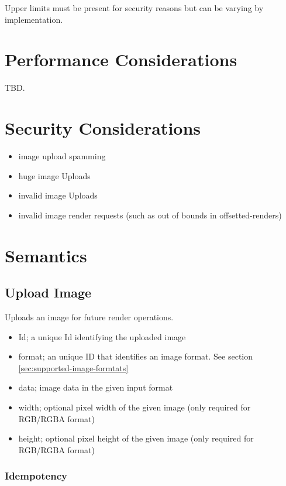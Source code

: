 \documentclass{article}
\begin{document}
Upper limits must be present for security reasons but can be varying by implementation.


\section{Performance Considerations} %

TBD.

\section{Security Considerations} %

\begin{itemize}
    \item image upload spamming
    \item huge image Uploads
    \item invalid image Uploads
    \item invalid image render requests (such as out of bounds in offsetted-renders)
\end{itemize}

\section{Semantics} %

\subsection{Upload Image}

Uploads an image for future render operations.

\begin{itemize}
    \item Id; a unique Id identifying the uploaded image
    \item format; an unique ID that identifies an image format. See section \ref{sec:supported-image-formtats}
    \item data; image data in the given input format
    \item width; optional pixel width of the given image (only required for RGB/RGBA format)
    \item height; optional pixel height of the given image (only required for RGB/RGBA format)
\end{itemize}

\subsubsection{Idempotency}
\end{document}
